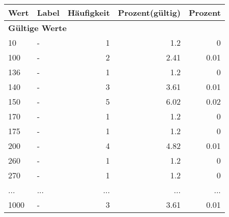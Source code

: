      \begin{longtable}{lXrrr}
     \toprule
     \textbf{Wert} & \textbf{Label} & \textbf{Häufigkeit} & \textbf{Prozent(gültig)} & \textbf{Prozent} \\
     \endhead
     \midrule
     \multicolumn{5}{l}{\textbf{Gültige Werte}}\\
        10 & \multicolumn{1}{X}{-} & %
          \num{1} &
          \num[round-mode=places,round-precision=2]{1.2} &
          \num[round-mode=places,round-precision=2]{0} \\
        100 & \multicolumn{1}{X}{-} & %
          \num{2} &
          \num[round-mode=places,round-precision=2]{2.41} &
          \num[round-mode=places,round-precision=2]{0.01} \\
        136 & \multicolumn{1}{X}{-} & %
          \num{1} &
          \num[round-mode=places,round-precision=2]{1.2} &
          \num[round-mode=places,round-precision=2]{0} \\
        140 & \multicolumn{1}{X}{-} & %
          \num{3} &
          \num[round-mode=places,round-precision=2]{3.61} &
          \num[round-mode=places,round-precision=2]{0.01} \\
        150 & \multicolumn{1}{X}{-} & %
          \num{5} &
          \num[round-mode=places,round-precision=2]{6.02} &
          \num[round-mode=places,round-precision=2]{0.02} \\
        170 & \multicolumn{1}{X}{-} & %
          \num{1} &
          \num[round-mode=places,round-precision=2]{1.2} &
          \num[round-mode=places,round-precision=2]{0} \\
        175 & \multicolumn{1}{X}{-} & %
          \num{1} &
          \num[round-mode=places,round-precision=2]{1.2} &
          \num[round-mode=places,round-precision=2]{0} \\
        200 & \multicolumn{1}{X}{-} & %
          \num{4} &
          \num[round-mode=places,round-precision=2]{4.82} &
          \num[round-mode=places,round-precision=2]{0.01} \\
        260 & \multicolumn{1}{X}{-} & %
          \num{1} &
          \num[round-mode=places,round-precision=2]{1.2} &
          \num[round-mode=places,round-precision=2]{0} \\
        270 & \multicolumn{1}{X}{-} & %
          \num{1} &
          \num[round-mode=places,round-precision=2]{1.2} &
          \num[round-mode=places,round-precision=2]{0} \\
       ... & ... & ... & ... & ... \\
        1000 & \multicolumn{1}{X}{-} & %
          \num{3} &
          \num[round-mode=places,round-precision=2]{3.61} &
          \num[round-mode=places,round-precision=2]{0.01} \\


\end{longtable}
